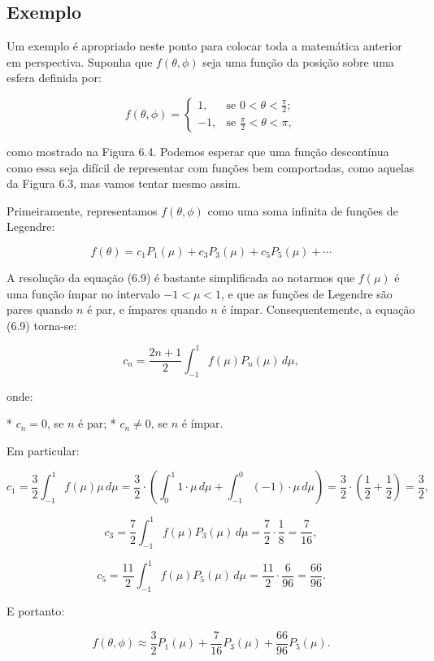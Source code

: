 \subsection{Exemplo}


Um exemplo é apropriado neste ponto para colocar toda a matemática anterior em perspectiva. Suponha que $f(\theta, \phi)$ seja uma função da posição sobre uma esfera definida por:

$$
f(\theta, \phi) =
\begin{cases}
1, & \text{se } 0 < \theta < \frac{\pi}{2}; \\
-1, & \text{se } \frac{\pi}{2} < \theta < \pi,
\end{cases}
$$

como mostrado na Figura 6.4. Podemos esperar que uma função descontínua como essa seja difícil de representar com funções bem comportadas, como aquelas da Figura 6.3, mas vamos tentar mesmo assim.

Primeiramente, representamos $f(\theta, \phi)$ como uma soma infinita de funções de Legendre:

$$
f(\theta) = c_1 P_1(\mu) + c_3 P_3(\mu) + c_5 P_5(\mu) + \cdots
$$

A resolução da equação (6.9) é bastante simplificada ao notarmos que $f(\mu)$ é uma função ímpar no intervalo $-1 < \mu < 1$, e que as funções de Legendre são pares quando $n$ é par, e ímpares quando $n$ é ímpar. Consequentemente, a equação (6.9) torna-se:

$$
c_n = \frac{2n + 1}{2} \int_{-1}^{1} f(\mu) P_n(\mu) \, d\mu,
$$

onde:

* $c_n = 0$, se $n$ é par;
* $c_n \ne 0$, se $n$ é ímpar.

Em particular:

$$
c_1 = \frac{3}{2} \int_{-1}^{1} f(\mu) \mu \, d\mu = \frac{3}{2} \cdot \left( \int_{0}^{1} 1 \cdot \mu \, d\mu + \int_{-1}^{0} (-1) \cdot \mu \, d\mu \right) = \frac{3}{2} \cdot \left( \frac{1}{2} + \frac{1}{2} \right) = \frac{3}{2},
$$

$$
c_3 = \frac{7}{2} \int_{-1}^{1} f(\mu) P_3(\mu) \, d\mu = \frac{7}{2} \cdot \frac{1}{8} = \frac{7}{16},
$$

$$
c_5 = \frac{11}{2} \int_{-1}^{1} f(\mu) P_5(\mu) \, d\mu = \frac{11}{2} \cdot \frac{6}{96} = \frac{66}{96}.
$$

E portanto:

$$
f(\theta, \phi) \approx \frac{3}{2} P_1(\mu) + \frac{7}{16} P_3(\mu) + \frac{66}{96} P_5(\mu).
$$

